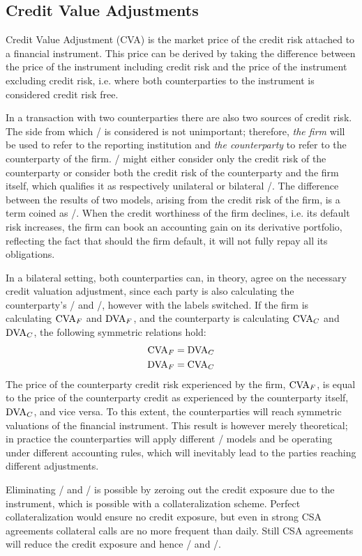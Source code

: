 \documentclass[main.tex]{subfiles}
\begin{document}
    \subsection{Credit Value Adjustments}
        Credit Value Adjustment (CVA) is the market price of the credit risk attached to a financial instrument.
        This price can be derived by taking the difference between the price of the instrument including credit risk
        and the price of the instrument excluding credit risk, 
        i.e. where both counterparties to the instrument is considered credit risk free.

        In a transaction with two counterparties there are also two sources of credit risk.
        The side from which \CVA/ is considered is not unimportant; 
        therefore, \textit{the firm} will be used to refer to the reporting institution 
        and \textit{the counterparty} to refer to the counterparty of the firm.
        \CVA/ might either consider only the credit risk of the counterparty 
        or consider both the credit risk of the counterparty and the firm itself,
        which qualifies it as respectively unilateral or bilateral \CVA/.
        The difference between the results of two models, arising from the credit risk of the firm,
        is a term coined as \DVA/.
        When the credit worthiness of the firm declines, i.e. its default risk increases,
        the firm can book an accounting gain on its derivative portfolio,
        reflecting the fact that should the firm default, it will not fully repay all its obligations.

        In a bilateral setting, both counterparties can, in theory, agree on the necessary credit valuation adjustment,
        since each party is also calculating the counterparty's \CVA/ and \DVA/, however with the labels switched.
        If the firm is calculating $\CVA/_{F}$ and $\DVA/_{F}$, 
        and the counterparty is calculating $\CVA/_{C}$ and $\DVA/_{C}$,
        the following symmetric relations hold:
            \begin{align*}
                \CVA/_{F} &= \DVA/_{C} \\
                \DVA/_{F} &= \CVA/_{C}
            \end{align*}
        The price of the counterparty credit risk experienced by the firm, $\CVA/_{F}$,
        is equal to the price of the counterparty credit as experienced by the counterparty itself, $\DVA/_{C}$,
        and vice versa.
        To this extent, the counterparties will reach symmetric valuations of the financial instrument. 
        This result is however merely theoretical; 
        in practice the counterparties will apply different \CVA/ models
        and be operating under different accounting rules, 
        which will inevitably lead to the parties reaching different adjustments. 
        
        Eliminating \CVA/ and \DVA/ is possible by zeroing out the credit exposure due to the instrument,
        which is possible with a collateralization scheme. 
        Perfect collateralization would ensure no credit exposure,
        but even in strong CSA agreements collateral calls are no more frequent than daily.
        Still CSA agreements will reduce the credit exposure and hence \CVA/ and \DVA/.
\end{document}
